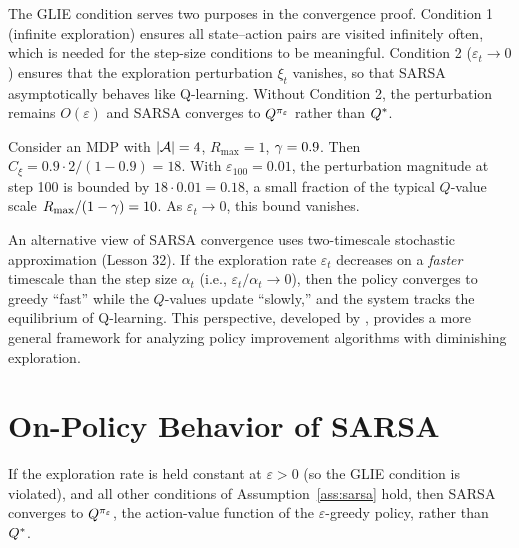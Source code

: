 \documentclass[11pt,a4paper]{article}
\begin{document}
\begin{remark}
\label{rem:glie_role}
The GLIE condition serves two purposes in the convergence proof.
Condition 1 (infinite exploration) ensures all state--action pairs
are visited infinitely often, which is needed for the step-size
conditions to be meaningful. Condition 2 ($\varepsilon_t \to 0$)
ensures that the exploration perturbation $\xi_t$ vanishes, so
that SARSA asymptotically behaves like Q-learning. Without
Condition 2, the perturbation remains $O(\varepsilon)$ and SARSA
converges to $Q^{\pi_\varepsilon}$ rather than $Q^*$.
\end{remark}

\begin{example}
\label{ex:perturbation}
Consider an MDP with $|\mathcal{A}| = 4$, $R_{\max} = 1$,
$\gamma = 0.9$. Then $C_\xi = 0.9 \cdot 2/(1-0.9) = 18$.
With $\varepsilon_{100} = 0.01$, the perturbation magnitude at
step 100 is bounded by $18 \cdot 0.01 = 0.18$, a small fraction
of the typical $Q$-value scale $R_{\max}/(1-\gamma) = 10$.
As $\varepsilon_t \to 0$, this bound vanishes.
\end{example}

\begin{rlconnection}[title={SARSA Convergence via Two-Timescale Analysis}]
An alternative view of SARSA convergence uses two-timescale
stochastic approximation (Lesson 32). If the exploration rate
$\varepsilon_t$ decreases on a \emph{faster} timescale than the
step size $\alpha_t$ (i.e., $\varepsilon_t/\alpha_t \to 0$), then
the policy converges to greedy ``fast'' while the $Q$-values update
``slowly,'' and the system tracks the equilibrium of Q-learning.
This perspective, developed by \citet{borkar2008}, provides a more
general framework for analyzing policy improvement algorithms with
diminishing exploration.
\end{rlconnection}

\section{On-Policy Behavior of SARSA}
\label{sec:on_policy}

\begin{proposition}
\label{prop:sarsa_fixed_eps}
If the exploration rate is held constant at $\varepsilon > 0$ (so
the GLIE condition is violated), and all other conditions of
Assumption~\ref{ass:sarsa} hold, then SARSA converges to
$Q^{\pi_\varepsilon}$, the action-value function of the
$\varepsilon$-greedy policy, rather than $Q^*$.
\end{proposition}
\end{document}
